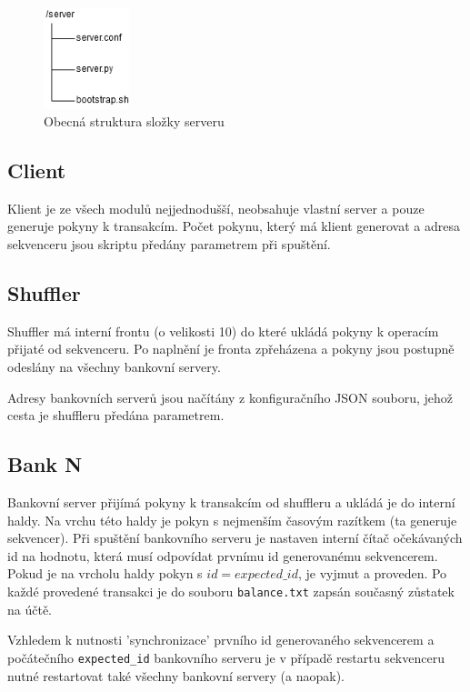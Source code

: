 \documentclass[11pt,a4paper]{scrartcl}
\begin{document}
	\begin{figure}[H]
		\centering
		\includegraphics[width=2.5cm]{server-structure.png}
		\caption{Obecná struktura složky serveru}
		\label{fig:serv-struct.pdf_tex}
	\end{figure}
	
	\subsection{Client}
	Klient je ze všech modulů nejjednodušší, neobsahuje vlastní server a pouze generuje pokyny k transakcím. Počet pokynu, který má klient generovat a adresa sekvenceru jsou skriptu předány parametrem při spuštění.
	
	\subsection{Shuffler}
	Shuffler má interní frontu (o velikosti 10) do které ukládá pokyny k operacím přijaté od sekvenceru. Po naplnění je fronta zpřeházena a pokyny jsou postupně odeslány na všechny bankovní servery.
	
	Adresy bankovních serverů jsou načítány z konfiguračního JSON souboru, jehož cesta je shuffleru předána parametrem.
	
	\subsection{Bank N}
	Bankovní server přijímá pokyny k transakcím od shuffleru a ukládá je do interní haldy. Na vrchu této haldy je pokyn s nejmenším časovým razítkem (ta generuje sekvencer). Při spuštění bankovního serveru je nastaven interní čítač očekávaných id na hodnotu, která musí odpovídat prvnímu id generovanému sekvencerem. Pokud je na vrcholu haldy pokyn s $id = expected\_id$, je vyjmut a proveden. 	Po každé provedené transakci je do souboru \verb|balance.txt| zapsán současný zůstatek na účtě. 
	
	Vzhledem k nutnosti 'synchronizace' prvního id generovaného sekvencerem a počátečního \verb|expected_id| bankovního serveru je v případě restartu sekvenceru nutné restartovat také všechny bankovní servery (a naopak).
	
\end{document}
